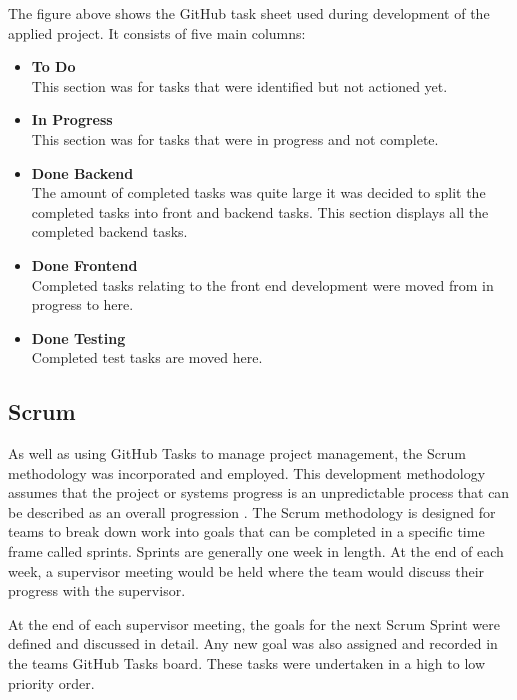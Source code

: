The figure above shows the GitHub task sheet used during development of the applied project. It consists of five main columns:

\begin{itemize}
\item \textbf{To Do}\\
This section was for tasks that were identified but not actioned yet.
\item \textbf{In Progress}\\
This section was for tasks that were in progress and not complete.
\item \textbf{Done Backend}\\
The amount of completed tasks was quite large it was decided to split the completed tasks into front and backend tasks. This section displays all the completed backend tasks.
\item \textbf{Done Frontend}\\
Completed tasks relating to the front end development were moved from in progress to here.
\item \textbf{Done Testing}\\
Completed test tasks are moved here.
\end{itemize}

\vspace{50mm} %

\subsection{Scrum}
As well as using GitHub Tasks to manage project management, the Scrum methodology was incorporated and employed. This development methodology assumes that the project or systems progress is an unpredictable process that can be described as an overall progression \cite{schwaber1997scrum}. The Scrum methodology is designed for teams to break down work into goals that can be completed in a specific time frame called sprints. Sprints are generally one week in length. At the end of each week, a supervisor meeting would be held where the team would discuss their progress with the supervisor.

\vspace{5mm} %

At the end of each supervisor meeting, the goals for the next Scrum Sprint were defined and discussed in detail. Any new goal was also assigned and recorded in the teams GitHub Tasks board. These tasks were undertaken in a high to low priority order.


